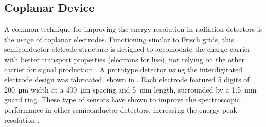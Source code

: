 \documentclass[../../../main.tex]{subfiles}
\begin{document}
%
    \subsection{Coplanar Device}%
    \label{sec:chapter-5:moving-forward:coplanar-device}%
    A common technique for improving the energy resolution in radiation detectors is the usage of coplanar electrodes.
    Functioning similar to Frisch grids, this semiconductor elctrode structure is designed to accomodate the charge carrier with better transport properties (electrons for \gls{lise}), not relying on the other carrier for signal production \cite{Luke_1994, Hamm_2015}.
    A prototype detector using the interdigitated electrode design was fabricated, shown in .
    Each electrode featured \num{5} digits of \SI{200}{\micro\meter} width at a \SI{400}{\micro\meter} spacing and \SI{5}{\milli\meter} length, surrounded by a \SI{1.5}{\milli\meter} guard ring.
    These type of sensors have shown to improve the spectroscopic performance in other semiconductor detectors, increasing the energy peak resolution \cite{He_1998, He_2005, thesis:Hamm_2018}.
\end{document}
